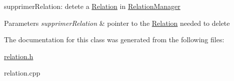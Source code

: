 supprimer\+Relation\+: detete a \hyperlink{class_relation}{Relation} in \hyperlink{class_relation_manager}{Relation\+Manager} 


\begin{DoxyParams}{Parameters}
{\em supprimer\+Relation} & pointer to the \hyperlink{class_relation}{Relation} needed to delete \\
\hline
\end{DoxyParams}


The documentation for this class was generated from the following files\+:\begin{DoxyCompactItemize}
\item 
\hyperlink{relation_8h}{relation.\+h}\item 
relation.\+cpp\end{DoxyCompactItemize}

